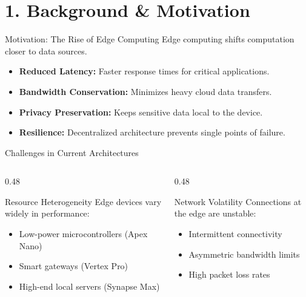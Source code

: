 \section{1. Background \& Motivation}

\begin{frame}{Motivation: The Rise of Edge Computing}
  Edge computing shifts computation closer to data sources.
  \begin{itemize}[<+->]
    \item \textbf{Reduced Latency:} Faster response times for critical applications.
    \item \textbf{Bandwidth Conservation:} Minimizes heavy cloud data transfers.
    \item \textbf{Privacy Preservation:} Keeps sensitive data local to the device.
    \item \textbf{Resilience:} Decentralized architecture prevents single points of failure.
  \end{itemize}
\end{frame}

\begin{frame}{Challenges in Current Architectures}
  \begin{columns}[T]
    \begin{column}{0.48\textwidth}
      \begin{block}{Resource Heterogeneity}
        Edge devices vary widely in performance:
        \begin{itemize}
          \item Low-power microcontrollers (Apex Nano)
          \item Smart gateways (Vertex Pro)
          \item High-end local servers (Synapse Max)
        \end{itemize}
      \end{block}
    \end{column}
    \hfill
    \begin{column}{0.48\textwidth}
      \begin{block}{Network Volatility}
        Connections at the edge are unstable:
        \begin{itemize}
          \item Intermittent connectivity
          \item Asymmetric bandwidth limits
          \item High packet loss rates
        \end{itemize}
      \end{block}
    \end{column}
  \end{columns}
\end{frame}

